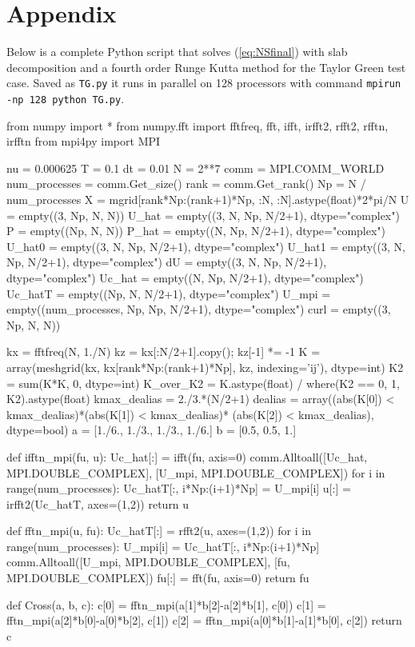 \documentclass[11pt, oneside]{article}
\newcommand{\inpyth}{\lstinline[style=pythonstyle, basicstyle=\ttfamily]} %[]%
\begin{document}


\newpage
\section*{Appendix}
\label{sec:appendix}
Below is a complete Python script that solves (\ref{eq:NSfinal}) with slab decomposition and a fourth order Runge Kutta method for the Taylor Green test case. Saved as \inpyth{TG.py} it runs in parallel on 128 processors with command \inpyth{mpirun -np 128 python TG.py}.
\begin{python}
from numpy import *
from numpy.fft import fftfreq, fft, ifft, irfft2, rfft2, rfftn, irfftn
from mpi4py import MPI

nu = 0.000625
T = 0.1
dt = 0.01
N = 2**7
comm = MPI.COMM_WORLD
num_processes = comm.Get_size()
rank = comm.Get_rank()
Np = N / num_processes
X = mgrid[rank*Np:(rank+1)*Np, :N, :N].astype(float)*2*pi/N
U     = empty((3, Np, N, N))
U_hat = empty((3, N, Np, N/2+1), dtype="complex")
P     = empty((Np, N, N))
P_hat = empty((N, Np, N/2+1), dtype="complex")
U_hat0  = empty((3, N, Np, N/2+1), dtype="complex")
U_hat1  = empty((3, N, Np, N/2+1), dtype="complex")
dU      = empty((3, N, Np, N/2+1), dtype="complex")
Uc_hat  = empty((N, Np, N/2+1), dtype="complex")
Uc_hatT = empty((Np, N, N/2+1), dtype="complex")
U_mpi   = empty((num_processes, Np, Np, N/2+1), dtype="complex")
curl    = empty((3, Np, N, N))

kx = fftfreq(N, 1./N)
kz = kx[:N/2+1].copy(); kz[-1] *= -1
K = array(meshgrid(kx, kx[rank*Np:(rank+1)*Np], kz, indexing='ij'), dtype=int)
K2 = sum(K*K, 0, dtype=int)
K_over_K2 = K.astype(float) / where(K2 == 0, 1, K2).astype(float)
kmax_dealias = 2./3.*(N/2+1)
dealias = array((abs(K[0]) < kmax_dealias)*(abs(K[1]) < kmax_dealias)*
                (abs(K[2]) < kmax_dealias), dtype=bool)
a = [1./6., 1./3., 1./3., 1./6.]
b = [0.5, 0.5, 1.]

def ifftn_mpi(fu, u):
    Uc_hat[:] = ifft(fu, axis=0)
    comm.Alltoall([Uc_hat, MPI.DOUBLE_COMPLEX], [U_mpi, MPI.DOUBLE_COMPLEX])
    for i in range(num_processes):
        Uc_hatT[:, i*Np:(i+1)*Np] = U_mpi[i]
    u[:] = irfft2(Uc_hatT, axes=(1,2))
    return u

def fftn_mpi(u, fu):
    Uc_hatT[:] = rfft2(u, axes=(1,2))
    for i in range(num_processes):
        U_mpi[i] = Uc_hatT[:, i*Np:(i+1)*Np]
    comm.Alltoall([U_mpi, MPI.DOUBLE_COMPLEX], [fu, MPI.DOUBLE_COMPLEX])
    fu[:] = fft(fu, axis=0)
    return fu

def Cross(a, b, c):
    c[0] = fftn_mpi(a[1]*b[2]-a[2]*b[1], c[0])
    c[1] = fftn_mpi(a[2]*b[0]-a[0]*b[2], c[1])
    c[2] = fftn_mpi(a[0]*b[1]-a[1]*b[0], c[2])
    return c


\end{python}
\end{document}
